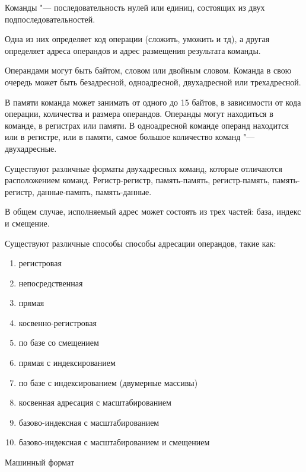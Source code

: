 Команды "--- последовательность нулей или единиц, состоящих из двух подпоследовательностей.

Одна из них определяет код операции (сложить, уможить и тд), а другая определяет адреса операндов
и адрес размещения результата команды.

Операндами могут быть байтом, словом или двойным словом. Команда в свою очередь может быть безадресной, 
одноадресной, двухадресной или трехадресной.

В памяти команда может занимать от одного до 15 байтов, в зависимости от кода операции, количества и
размера операндов. Операнды могут находиться в команде, в регистрах или памяти. В одноадресной команде
операнд находится или в регистре, или в памяти, самое большое количество команд "--- двухадресные.

Существуют различные форматы двухадресных команд, которые отличаются расположением команд.
Регистр-регистр, память-память, регистр-память, память-регистр, данные-память, память-данные.

В общем случае, исполняемый адрес может состоять из трех частей: база, индекс и смещение.

Существуют различные способы способы адресации операндов, такие как:
\begin{enumerate}
    \item регистровая
    \item непосредственная
    \item прямая
    \item косвенно-регистровая
    \item по базе со смещением
    \item прямая с индексированием
    \item по базе с индексированием (двумерные массивы)
    \item косвенная адресация с масштабированием
    \item базово-индексная с масштабированием
    \item базово-индексная с масштабированием и смещением
    
\end{enumerate}

Машинный формат

